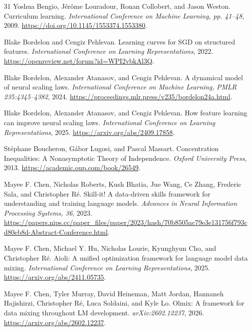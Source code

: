 \begin{thebibliography}{31}\label{sec:references}
Yoshua Bengio, J\'er\^ome Louradour, Ronan Collobert, and Jason Weston. Curriculum learning. \emph{International Conference on Machine Learning, pp. 41--48}, 2009. \url{https://doi.org/10.1145/1553374.1553380}.

Blake Bordelon and Cengiz Pehlevan. Learning curves for SGD on structured features. \emph{International Conference on Learning Representations}, 2022. \url{https://openreview.net/forum?id=WPI2vbkAl3Q}.

Blake Bordelon, Alexander Atanasov, and Cengiz Pehlevan. A dynamical model of neural scaling laws. \emph{International Conference on Machine Learning, PMLR 235:4345--4382}, 2024. \url{https://proceedings.mlr.press/v235/bordelon24a.html}.

Blake Bordelon, Alexander Atanasov, and Cengiz Pehlevan. How feature learning can improve neural scaling laws. \emph{International Conference on Learning Representations}, 2025. \url{https://arxiv.org/abs/2409.17858}.

St\'ephane Boucheron, G\'abor Lugosi, and Pascal Massart. Concentration Inequalities: A Nonasymptotic Theory of Independence. \emph{Oxford University Press}, 2013. \url{https://academic.oup.com/book/26549}.

Mayee F. Chen, Nicholas Roberts, Kush Bhatia, Jue Wang, Ce Zhang, Frederic Sala, and Christopher R\'e. Skill-it! A data-driven skills framework for understanding and training language models. \emph{Advances in Neural Information Processing Systems, 36}, 2023. \url{https://papers.nips.cc/paper_files/paper/2023/hash/70b8505ac79e3e131756f793cd80eb8d-Abstract-Conference.html}.

Mayee F. Chen, Michael Y. Hu, Nicholas Lourie, Kyunghyun Cho, and Christopher R\'e. Aioli: A unified optimization framework for language model data mixing. \emph{International Conference on Learning Representations}, 2025. \url{https://arxiv.org/abs/2411.05735}.

Mayee F. Chen, Tyler Murray, David Heineman, Matt Jordan, Hannaneh Hajishirzi, Christopher R\'e, Luca Soldaini, and Kyle Lo. Olmix: A framework for data mixing throughout LM development. \emph{arXiv:2602.12237}, 2026. \url{https://arxiv.org/abs/2602.12237}.


\end{thebibliography}
